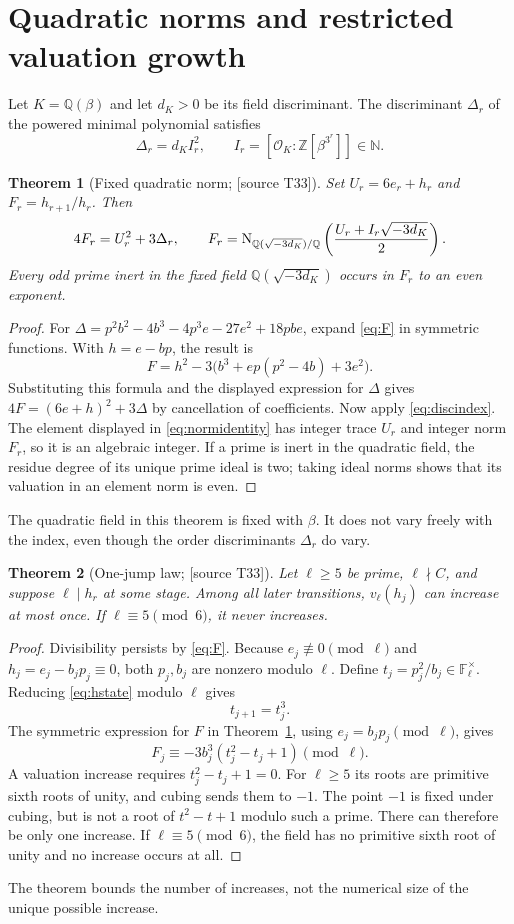 \documentclass[11pt,a4paper]{article}
\newtheorem{theorem}{Theorem}[section]
\theoremstyle{definition}\newtheorem{definition}[theorem]{Definition}
\theoremstyle{remark}\newtheorem{remark}[theorem]{Remark}
\newcommand{\Q}{\mathbb Q}\newcommand{\Z}{\mathbb Z}\newcommand{\N}{\mathbb N}\newcommand{\R}{\mathbb R}\newcommand{\C}{\mathbb C}
\newcommand{\sourceT}[1]{\textup{[source T#1]}}
\begin{document}
\section{Quadratic norms and restricted valuation growth}
Let $K=\Q(\beta)$ and let $d_K>0$ be its field discriminant. The discriminant $\Delta_r$ of the powered minimal polynomial satisfies
\begin{equation}\label{eq:discindex}
 \Delta_r=d_K I_r^2,\qquad I_r=[\mathcal O_K:\Z[\beta^{3^r}]]\in\N.
\end{equation}
\begin{theorem}[Fixed quadratic norm; \sourceT{33}]\label{thm:norm}
Set $U_r=6e_r+h_r$ and $F_r=h_{r+1}/h_r$. Then
\begin{equation}\label{eq:normidentity}
 4F_r=U_r^2+3\Delta_r,
 \qquad
 F_r=\Norm_{\Q(\sqrt{-3d_K})/\Q}
 \left(\frac{U_r+I_r\sqrt{-3d_K}}2\right).
\end{equation}
Every odd prime inert in the fixed field $\Q(\sqrt{-3d_K})$ occurs in $F_r$ to an even exponent.
\end{theorem}
\begin{proof}
For $\Delta=p^2b^2-4b^3-4p^3e-27e^2+18pbe$, expand \eqref{eq:F} in symmetric functions. With $h=e-bp$, the result is
\[
 F=h^2-3\bigl(b^3+ep(p^2-4b)+3e^2\bigr).
\]
Substituting this formula and the displayed expression for $\Delta$ gives $4F=(6e+h)^2+3\Delta$ by cancellation of coefficients. Now apply \eqref{eq:discindex}. The element displayed in \eqref{eq:normidentity} has integer trace $U_r$ and integer norm $F_r$, so it is an algebraic integer. If a prime is inert in the quadratic field, the residue degree of its unique prime ideal is two; taking ideal norms shows that its valuation in an element norm is even.
\end{proof}
The quadratic field in this theorem is fixed with $\beta$. It does not vary freely with the index, even though the order discriminants $\Delta_r$ do vary.

\begin{theorem}[One-jump law; \sourceT{33}]\label{thm:onejump}
Let $\ell\ge5$ be prime, $\ell\nmid C$, and suppose $\ell\mid h_r$ at some stage. Among all later transitions, $v_\ell(h_j)$ can increase at most once. If $\ell\equiv5\pmod6$, it never increases.
\end{theorem}
\begin{proof}
Divisibility persists by \eqref{eq:F}. Because $e_j\not\equiv0\pmod\ell$ and $h_j=e_j-b_jp_j\equiv0$, both $p_j,b_j$ are nonzero modulo $\ell$. Define $t_j=p_j^2/b_j\in\mathbb F_\ell^\times$. Reducing \eqref{eq:hstate} modulo $\ell$ gives
\[
 t_{j+1}=t_j^3.
\]
The symmetric expression for $F$ in Theorem~\ref{thm:norm}, using $e_j=b_jp_j\pmod\ell$, gives
\[
 F_j\equiv-3b_j^3(t_j^2-t_j+1)\pmod\ell.
\]
A valuation increase requires $t_j^2-t_j+1=0$. For $\ell\ge5$ its roots are primitive sixth roots of unity, and cubing sends them to $-1$. The point $-1$ is fixed under cubing, but is not a root of $t^2-t+1$ modulo such a prime. There can therefore be only one increase. If $\ell\equiv5\pmod6$, the field has no primitive sixth root of unity and no increase occurs at all.
\end{proof}
The theorem bounds the number of increases, not the numerical size of the unique possible increase.
\end{document}
